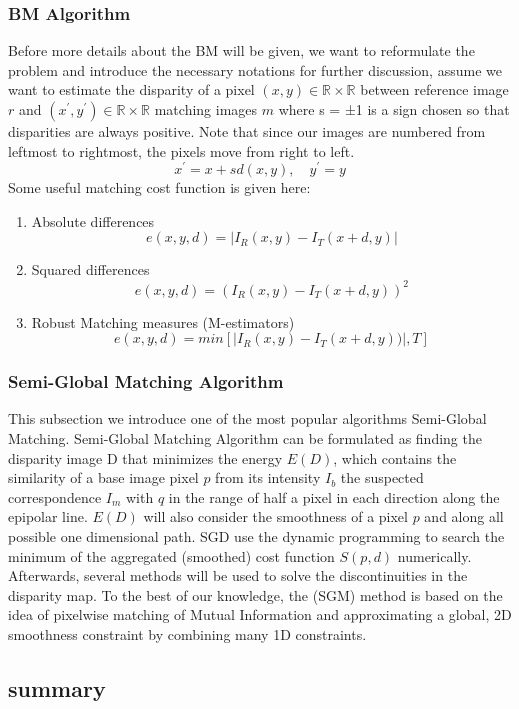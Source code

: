 \subsubsection{BM Algorithm}
\label{BM Algorithm}
Before more details about the BM will be given, we want to reformulate the problem and introduce the necessary notations for further discussion, assume we want to estimate the disparity of a pixel $(x,y) \in \mathbb{R}\times \mathbb{R}$ between reference image $r$ and  $(x^{'},y^{'}) \in \mathbb{R}\times \mathbb{R}$ matching images $m$ where s = ±1 is a sign chosen so that disparities are always positive. Note that since our images are numbered from leftmost to rightmost, the pixels move from right to left\cite{scharstein2002taxonomy}.
\begin{equation}
    x^{'} = x + sd(x,y), \quad y^{'} = y
\end{equation}
Some useful matching cost function is given here:
\begin{enumerate}
    \item Absolute differences
        \begin{equation}
            e(x,y,d) = |I_R(x,y)-I_T(x+d,y)|
        \end{equation}
    \item Squared differences
        \begin{equation}
            e(x,y,d) = (I_R(x,y)-I_T(x+d,y))^2
        \end{equation}
    \item Robust Matching measures (M-estimators)
    \begin{equation}
        e(x,y,d) = min[ |I_R(x,y)-I_T(x+d,y))|, T ]
    \end{equation}
\end{enumerate}


\subsubsection{Semi-Global Matching Algorithm}
\label{Semi-Global Matching}
This subsection we introduce one of the most popular algorithms Semi-Global Matching. Semi-Global Matching Algorithm can be formulated as finding the disparity image D that minimizes the energy $E(D)$, which contains the similarity of a base image pixel $p$ from its intensity $I_b$ the suspected correspondence $I_m$ with $q$ in the range of half a pixel in each direction along the epipolar line. $E(D)$ will also consider the smoothness of a pixel $p$ and along all possible one dimensional path. SGD use the dynamic programming to search the minimum of the aggregated (smoothed) cost function $S(p, d)$ numerically. Afterwards, several methods will be used to solve the discontinuities in the disparity map. To the best of our knowledge, the  (SGM) method is based on the idea of pixelwise matching of Mutual Information and approximating a global, 2D smoothness constraint by combining many 1D constraints\cite{hirschmuller2007stereo}. 


\subsection{summary}


